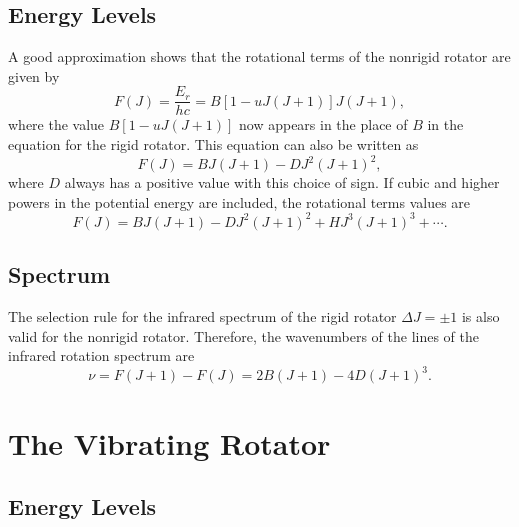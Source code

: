 \documentclass[11pt, twoside, fleqn]{report}
\begin{document}
\section{Energy Levels}
\label{s:energy_levels_4}

A good approximation shows that the rotational terms of the nonrigid rotator are given by
\begin{equation*}
    F(J) = \frac{E_r}{hc} = B[1 - uJ(J + 1)]J(J + 1),
\end{equation*}
where the value $B[1 - uJ(J + 1)]$ now appears in the place of $B$ in the equation for the rigid rotator. This equation can also be written as
\begin{equation*}
    F(J) = BJ(J + 1) - DJ^2(J + 1)^2,
\end{equation*}
where $D$ always has a positive value with this choice of sign. If cubic and higher powers in the potential energy are included, the rotational terms values are
\begin{equation*}
    F(J) = BJ(J + 1) - DJ^2(J + 1)^2 + HJ^3(J + 1)^3 + \dotsb.
\end{equation*}

\section{Spectrum}
\label{s:spectrum_3}

The selection rule for the infrared spectrum of the rigid rotator $\Delta{}J = \pm 1$ is also valid for the nonrigid rotator. Therefore, the wavenumbers of the lines of the infrared rotation spectrum are
\begin{equation*}
    \nu = F(J + 1) - F(J) = 2B(J + 1) - 4D(J + 1)^3.
\end{equation*}

\chapter{The Vibrating Rotator}
\label{c:the_vibrating_rotator}

\section{Energy Levels}
\label{s:energy_levels_5}
\end{document}
